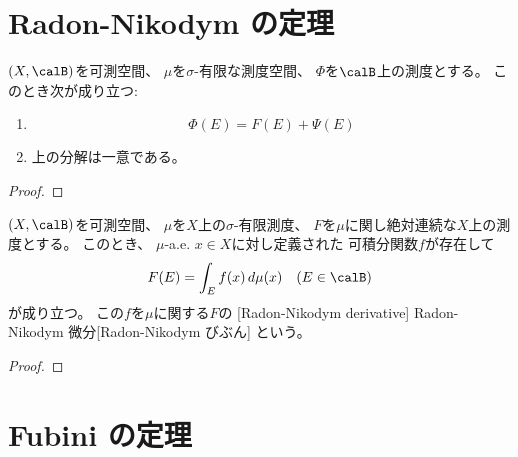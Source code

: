 \documentclass[report]{jlreq}
\begin{document}
\section{Radon-Nikodym の定理}

\begin{definition}[絶対連続と特異]
    \TODO{}
\end{definition}

\begin{proposition}[Lebesgue 分解]
    $(X, \calB)$を可測空間、
    $\mu$を$\sigma$-有限な測度空間、
    $\Phi$を$\calB$上の測度とする。
    このとき次が成り立つ:
    \begin{enumerate}
        \item \TODO{}
            \begin{equation}
                \Phi(E) = F(E) + \Psi(E)
            \end{equation}
        \item 上の分解は一意である。
    \end{enumerate}
\end{proposition}

\begin{proof}
    \TODO{}
\end{proof}

\begin{theorem}
    $(X, \calB)$を可測空間、
    $\mu$を$X$上の$\sigma$-有限測度、
    $F$を$\mu$に関し絶対連続な$X$上の測度とする。
    このとき、
    $\mu$-a.e. $x \in X$に対し定義された
    可積分関数$f$が存在して
    \begin{equation}
        F(E) = \int_E f(x) \, d\mu(x)
            \quad
            (E \in \calB)
    \end{equation}
    が成り立つ。
    この$f$を$\mu$に関する$F$の
    [Radon-Nikodym derivative]
        {Radon-Nikodym 微分}[Radon-Nikodym びぶん]
    という。
\end{theorem}

\begin{proof}
    \TODO{}
\end{proof}

%
\section{Fubini の定理}

\begin{theorem}
    \TODO{}
\end{theorem}
\end{document}
